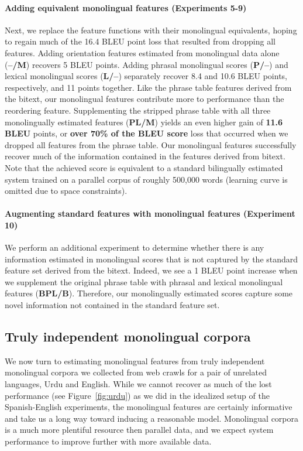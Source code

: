 \documentclass[11pt]{article}
\newcommand{\figref}[1]{Figure~\ref{#1}}
\begin{document}
\paragraph{Adding equivalent monolingual features (Experiments 5-9)} \label{sect:exp:replacement}

Next, we replace the feature functions with their monolingual equivalents, hoping to regain much of the 16.4 BLEU point loss that resulted from dropping all features.  Adding orientation features estimated from monolingual data alone ({\bf --/M})  recovers 5 BLEU points. Adding phrasal monolingual scores ({\bf P/--}) and lexical monolingual scores ({\bf L/--}) separately recover 8.4 and 10.6 BLEU points, respectively, and 11 points together. Like the phrase table features derived from the bitext, our monolingual features contribute more to performance than the reordering feature. Supplementing the stripped phrase table with all three monolingually estimated features ({\bf PL/M}) yields an even higher gain of {\bf 11.6 BLEU} points, or {\bf over 70\% of the BLEU score} loss that occurred when we dropped all features from the phrase table. Our monolingual features successfully recover much of the information contained in the features derived from bitext.  Note that the achieved score is equivalent to a standard bilingually estimated system trained on a parallel corpus of roughly 500,000 words (learning curve is omitted due to space constraints).

\paragraph{Augmenting standard features with monolingual features (Experiment 10)} \label{sect:exp:augment}
We perform an additional experiment to determine whether there is any information estimated in monolingual scores that is not captured by the standard feature set derived from the bitext. Indeed, we see a 1 BLEU point increase when we supplement the original phrase table with phrasal and lexical monolingual features ({\bf BPL/B}). Therefore, our monolingually estimated scores capture some novel information not contained in the standard feature set.

\subsection{Truly independent monolingual corpora} \label{sect:exp:indep}

We now turn to estimating monolingual features from truly independent monolingual corpora we collected from web crawls for a pair of unrelated languages, Urdu and English.  While we cannot recover as much of the lost performance (see \figref{fig:urdu}) as we did in the idealized setup of the Spanish-English experiments, the monolingual features are certainly informative and take us a long way toward inducing a reasonable model.  Monolingual corpora is a much more plentiful resource then parallel data, and we expect system performance to improve further with more available data.
\end{document}
